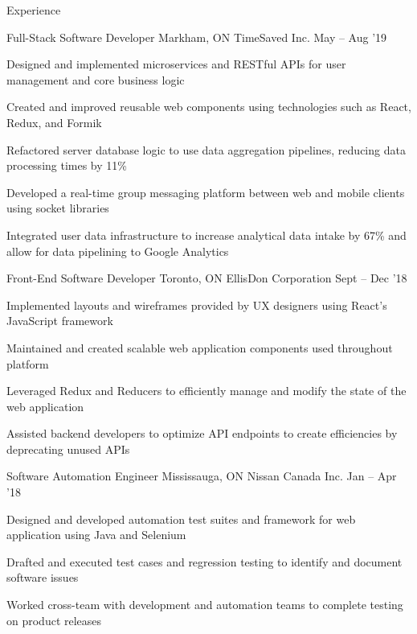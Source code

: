 \documentclass{resume} %
\begin{document}
\begin{rSection}{Experience}
  \begin{rWorkSection}
    {Full-Stack Software Developer}
    {Markham, ON}
    {TimeSaved Inc.}
    {May -- Aug '19}
    \item Designed and implemented microservices and RESTful APIs for user management and core business logic
    \item Created and improved reusable web components using technologies such as React, Redux, and Formik
    \item Refactored server database logic to use data aggregation pipelines, reducing data processing times by 11{\%} 
    \item Developed a real-time group messaging platform between web and mobile clients using socket libraries
    \item Integrated user data infrastructure to increase analytical data intake by 67{\%} and allow for data pipelining to Google Analytics
  \end{rWorkSection}

    \vspace{-0.3em}

    \begin{rWorkSection}{Front-End Software Developer}
                      {Toronto, ON}
                      {EllisDon Corporation}
                      {Sept -- Dec '18}
    \item Implemented layouts and wireframes provided by UX designers using React's JavaScript framework
    \item Maintained and created scalable web application components used throughout platform
    \item Leveraged Redux and Reducers to efficiently manage and modify the state of the web application
    \item Assisted backend developers to optimize API endpoints to create efficiencies by deprecating unused APIs
  \end{rWorkSection}

    \vspace{-0.3em}

  \begin{rWorkSection}{Software Automation Engineer}
                     {Mississauga, ON}
                     {Nissan Canada Inc.}
                     {Jan -- Apr '18}
    \item Designed and developed automation test suites and framework for web application using Java and Selenium
    \item Drafted and executed test cases and regression testing to identify and document software issues
    \item Worked cross-team with development and automation teams to complete testing on product releases
  \end{rWorkSection}
  \vspace{-0.1em}
\end{rSection}
\end{document}
